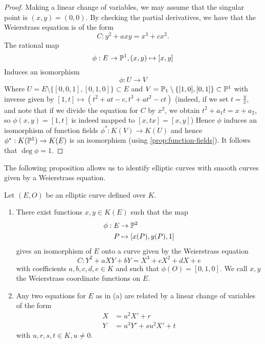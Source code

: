 \begin{proof}
	Making a linear change of variables, we may assume that the singular point
	is $(x, y) = (0, 0)$. By checking the partial derivatives, we have that
	the Weierstrass equation is of the form
	\begin{equation*}
		C: y^2 + axy = x^3 + cx^2.
	\end{equation*}
	The rational map
	\begin{equation*}
		\phi: E \to \mathbb{P}^1, (x, y) \mapsto [x, y]
	\end{equation*}
	Induces an isomorphism
	\begin{equation*}
		\phi: U \to V
	\end{equation*}
	Where $U = E\setminus\{[0, 0, 1], [0, 1, 0]\} \subset E$
	and $V = \mathbb{P}_1\setminus\{[1, 0], [0, 1]\} \subset \mathbb{P}^1$
	with inverse given by $[1, t]\mapsto(t^2 + at - c, t^3 + at^2 - ct)$
	(indeed, if we set $t = \frac{y}{x}$, and note that if we divide the
	equation for $C$ by $x^2$, we obtain $t^2 + a_1t = x+ a_2$, so
	$\phi(x, y) = [1, t]$ is indeed mapped to $[x, tx] = [x, y]$)
	Hence $\phi$ induces an isomorphism of function fields
	$\phi^*: K(V) \to K(U)$ and hence
	$\phi^*: K(\mathbb{P}^1) \to K(E)$ is an isomorphism 
	(using \ref{prop:function-fields}).
	It follows that $\deg\phi = 1$.
\end{proof}


The following proposition allows us to identify elliptic curves
with smooth curves given by a Weierstrass equation.
\begin{proposition}
	\label{prop:curve-correspondence}
	Let $(E, O)$ be an elliptic curve defined over $K$.
	\begin{enumerate}[itemsep=0em, label=(\alph*)]
		\item There exist functions $x, y \in K(E)$ such that the map
			\begin{align*}
				\phi: E &\to \mathbb{P}^2\\
				P &\mapsto [x(P), y(P), 1]
			\end{align*}
			gives an isomorphism of $E$  onto a curve given by 
			the Weierstrass equation
			\begin{equation*}
				C: Y^2 + aXY + bY = X^3 + cX^2 + dX + e
			\end{equation*}
			with coefficients $a, b, c, d, e \in K$ and such that $\phi(O) =
			[0,1, 0]$. We call $x, y$ the Weierstrass coordinate functions
			on $E$.
		\item Any two equations for $E$ as in (a) are related by a linear change
			of variables of the form
			\begin{align*}
				X &= u^2X' + r\\
				Y &= u^3Y' + su^2X' + t
			\end{align*}
			with $u, r, s, t \in K, u \neq 0$.
	\end{enumerate}
\end{proposition}

